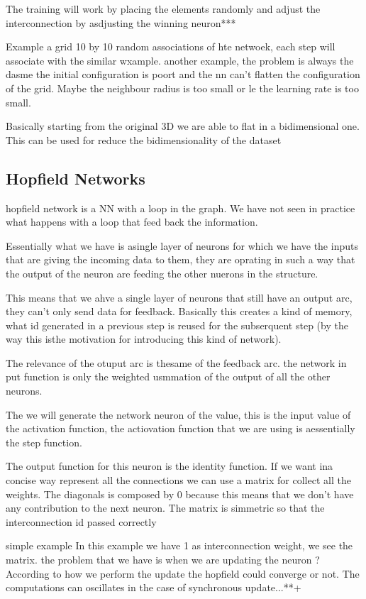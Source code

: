 \documentclass{article}
\begin{document}
The training will work by placing the elements randomly and adjust the interconnection by asdjusting the winning neuron***

Example a grid 10 by 10
random associations of hte netwoek, each step will associate with the similar wxample.
another example,
the problem is always the dasme the initial configuration is poort and the nn can't flatten the configuration
of the grid. Maybe the neighbour radius is too small or le the learning rate is too small.


Basically starting from the original 3D we are able to flat in a bidimensional one. This can be used for reduce the bidimensionality
of the dataset

\subsection{Hopfield Networks}
hopfield network is a NN with a loop in the graph. We have not seen in practice
what happens with a loop that feed back the information.

Essentially what we have is asingle layer of neurons for which we have the inputs that are
giving the incoming data to them, they are oprating in such a way
that the output of the neuron are feeding the other nuerons in the structure.

This means that we ahve a single layer of neurons that still have an output arc, they
can't only send data for feedback.
Basically this creates a kind of memory, what id generated in a previous step is reused for the
subserquent step (by the way this isthe motivation for introducing this kind of network).

The relevance of the otuput arc is thesame of the feedback arc. the network in put function is
only the weighted usmmation of the output of all the other neurons.

The we will generate the network neuron of the value, this is the input value of the activation
function, the actiovation function that we are using is aessentially
the step function.

The output function for this neuron is the identity function. If we want ina concise way represent all
the connections we can use a matrix for collect all the weights. The diagonals is composed by 0
because this means that we don't have any contribution to the next neuron. The matrix is simmetric
so that the interconnection id passed correctly

simple example
In this example we have 1 as interconnection weight, we see the matrix.
the problem that we have is when we are updating the neuron ? According to how we perform
the update the hopfield could converge or not. The computations can oscillates in the case
of synchronous update...**+
\end{document}
